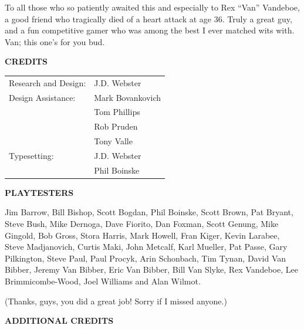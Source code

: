 To all those who so patiently awaited this and especially to Rex “Van” Vandeboe, a good friend who tragically died of a heart attack at age 36. Truly a great guy, and a fun competitive gamer who was among the best I ever matched wits with. Van; this one’s for you bud.

\begin{center}
\textbf{CREDITS}
\end{center}

\begin{tabular}{@{}p{4cm}p{4cm}}
Research and Design: &J.D. Webster\\
Design Assistance:   &Mark Bovankovich\\
                     &Tom Phillips\\
                     &Rob Pruden\\
                     &Tony Valle\\
Typesetting:         &J.D. Webster\\
                     &Phil Boinske\\
\end{tabular}

\begin{center}
\textbf{PLAYTESTERS}
\end{center}

Jim Barrow, Bill Bishop, Scott Bogdan, Phil Boinske, Scott Brown, Pat Bryant, Steve Bush, Mike Dernoga, Dave Fiorito, Dan Foxman, Scott Genung, Mike Gingold, Bob Gross, Stora Harris, Mark Howell, Fran Kiger, Kevin Larabee, Steve Madjanovich, Curtis Maki, John Metcalf, Karl Mueller, Pat Passe, Gary Pilkington, Steve Paul, Paul Procyk, Arin Schonbach, Tim Tynan, David Van Bibber, Jeremy Van Bibber, Eric Van Bibber, Bill Van Slyke, Rex Vandeboe, Lee Brimmicombe-Wood, Joel Williams and Alan Wilmot.

(Thanks, guys, you did a great job! Sorry if I missed anyone.)

\newpage

\begin{center}
\textbf{ADDITIONAL CREDITS}
\end{center}

